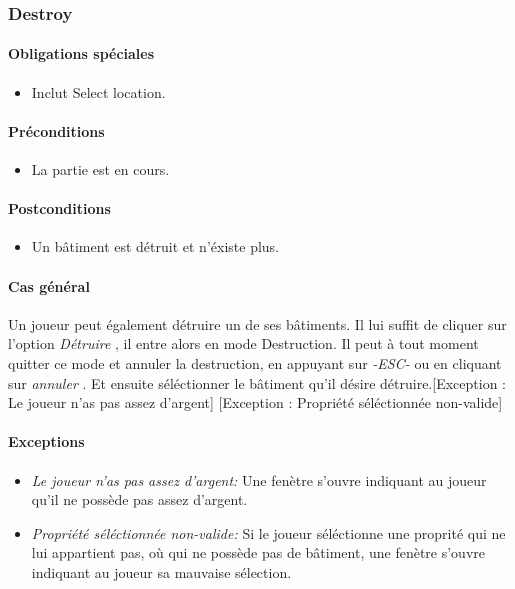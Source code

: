 \documentclass[a4paper,11pt]{report}
\begin{document}
\subsubsection{Destroy}
\paragraph{Obligations spéciales}
\begin{itemize}
 \item Inclut Select location.
\end{itemize}
\paragraph{Préconditions}
\begin{itemize}
 \item La partie est en cours.
\end{itemize}
\paragraph{Postconditions}
\begin{itemize}
 \item Un bâtiment est détruit et n'éxiste plus.
\end{itemize}
\paragraph{Cas général}
Un joueur peut également détruire un de ses bâtiments. Il lui suffit de cliquer sur l'option \og \textit{Détruire} \fg, il entre alors en mode Destruction. Il peut à tout moment quitter ce mode et annuler la destruction, en appuyant sur \og \textit{-ESC-} \fg ou en cliquant sur \og \textit{annuler} \fg. Et ensuite séléctionner le bâtiment qu'il désire détruire.[Exception : Le joueur n'as pas assez d'argent] [Exception : Propriété séléctionnée non-valide]
\paragraph{Exceptions}
\begin{itemize}
 \item \textit{Le joueur n'as pas assez d'argent:}  Une fenètre s'ouvre indiquant au joueur qu'il ne possède pas assez d'argent.
  \item \textit{Propriété séléctionnée non-valide:}  Si le joueur séléctionne une proprité qui ne lui appartient pas, où qui ne possède pas de bâtiment, une fenètre s'ouvre indiquant au joueur sa mauvaise sélection.
\end{itemize}
\end{document}
